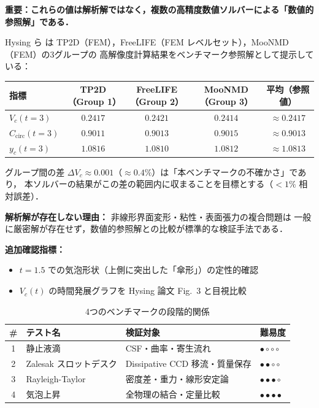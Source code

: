 \begin{tcolorbox}[mybox, title={Hysing (2009) Test Case 1 の参照値（数値参照解）}]
\textbf{重要：これらの値は解析解ではなく，複数の高精度数値ソルバーによる「数値的参照解」である．}

Hysing ら \cite{Hysing2009} は TP2D（FEM），FreeLIFE（FEM レベルセット），MooNMD（FEM）の3グループの
高解像度計算結果をベンチマーク参照解として提示している：

\begin{center}
\renewcommand{\arraystretch}{1.3}
\begin{tabular}{lcccc}
\hline
指標 & TP2D（Group 1） & FreeLIFE（Group 2） & MooNMD（Group 3） & 平均（参照値） \\
\hline
$V_c(t=3)$ & $0.2417$ & $0.2421$ & $0.2414$ & $\approx 0.2417$ \\
$C_{\mathrm{circ}}(t=3)$ & $0.9011$ & $0.9013$ & $0.9015$ & $\approx 0.9013$ \\
$y_c(t=3)$ & $1.0816$ & $1.0810$ & $1.0812$ & $\approx 1.0813$ \\
\hline
\end{tabular}
\end{center}

グループ間の差 $\Delta V_c \approx 0.001$（$\approx 0.4\%$）は「本ベンチマークの不確かさ」であり，
本ソルバーの結果がこの差の範囲内に収まることを目標とする（$< 1\%$ 相対誤差）．

\textbf{解析解が存在しない理由：} 非線形界面変形・粘性・表面張力の複合問題は
一般に厳密解が存在せず，数値的参照解との比較が標準的な検証手法である．

\textbf{追加確認指標：}
\begin{itemize}
  \item $t = 1.5$ での気泡形状（上側に突出した「傘形」）の定性的確認
  \item $V_c(t)$ の時間発展グラフを Hysing 論文 Fig.~3 と目視比較
\end{itemize}
\end{tcolorbox}

\begin{table}[h]
\centering
\caption{4つのベンチマークの段階的関係}
\renewcommand{\arraystretch}{1.3}
\begin{tabular}{clll}
\hline
\# & テスト名 & 検証対象 & 難易度 \\
\hline
1 & 静止液滴 & CSF・曲率・寄生流れ & $\bullet\circ\circ\circ$ \\
2 & Zalesak スロットデスク & Dissipative CCD 移流・質量保存 & $\bullet\bullet\circ\circ$ \\
3 & Rayleigh-Taylor & 密度差・重力・線形安定論 & $\bullet\bullet\bullet\circ$ \\
4 & 気泡上昇 & 全物理の結合・定量比較 & $\bullet\bullet\bullet\bullet$ \\
\hline
\end{tabular}
\end{table}


